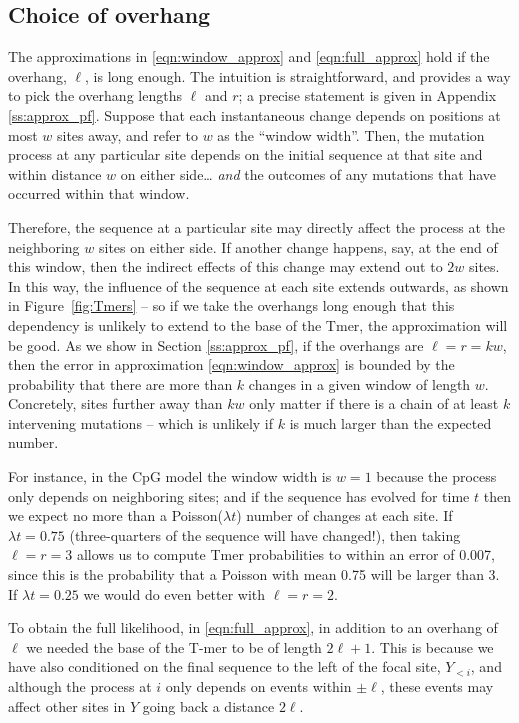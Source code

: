 \documentclass{article}
\theoremstyle{plain}
\theoremstyle{definition}
\begin{document}
\subsection{Choice of overhang}

The approximations in \eqref{eqn:window_approx} and \eqref{eqn:full_approx} hold
if the overhang, $\ell$, is long enough.
The intuition is straightforward, and provides a way to pick the overhang lengths $\ell$ and $r$;
a precise statement is given in Appendix \ref{ss:approx_pf}.
Suppose that each instantaneous change depends on positions at most $w$ sites away,
and refer to $w$ as the ``window width''.
Then, the mutation process at any particular site
depends on the initial sequence at that site and within distance $w$ on either side\ldots
\emph{and} the outcomes of any mutations that have occurred within that window.

Therefore, the sequence at a particular site may directly affect the process at the neighboring $w$ sites on either side.
If another change happens, say, at the end of this window,
then the indirect effects of this change may extend out to $2w$ sites.
In this way, the influence of the sequence at each site extends outwards, as shown in Figure~\ref{fig:Tmers} --
so if we take the overhangs long enough that this dependency is unlikely to extend to the base of the Tmer,
the approximation will be good.
As we show in Section \ref{ss:approx_pf}, if the overhangs are $\ell = r = kw$,
then the error in approximation \eqref{eqn:window_approx}
is bounded by the probability that there are more than $k$ changes in a given window of length $w$.
Concretely, sites further away than $kw$ only matter if there is a chain of at least $k$ intervening mutations
-- which is unlikely if $k$ is much larger than the expected number.

For instance, in the CpG model the window width is $w=1$
because the process only depends on neighboring sites;
and if the sequence has evolved for time $t$ then we expect no more than a Poisson($\lambda t$) number of changes at each site.
If $\lambda t = 0.75$ (three-quarters of the sequence will have changed!),
then taking $\ell = r = 3$ allows us to compute Tmer probabilities to within an error of 0.007,
since this is the probability that a Poisson with mean 0.75 will be larger than 3.
If $\lambda t = 0.25$ we would do even better with $\ell = r = 2$.

To obtain the full likelihood, in \eqref{eqn:full_approx}, in addition to an overhang of $\ell$
we needed the base of the T-mer to be of length $2\ell+1$.
This is because we have also conditioned on the final sequence to the left of the focal site, $Y_{<i}$,
and although the process at $i$ only depends on events within $\pm \ell$,
these events may affect other sites in $Y$ going back a distance $2\ell$.
\end{document}
